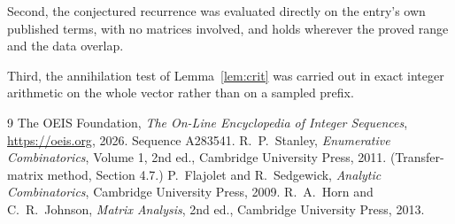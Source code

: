 \documentclass[11pt,a4paper]{article}
\theoremstyle{plain}
\theoremstyle{definition}
\begin{document}
Second, the conjectured recurrence was evaluated directly on the entry's own published terms,
with no matrices involved, and holds wherever the proved range and the data overlap.

Third, the annihilation test of Lemma~\ref{lem:crit} was carried out in exact integer
arithmetic on the whole vector rather than on a sampled prefix.

\begin{thebibliography}{9}
 The OEIS Foundation, \emph{The On-Line Encyclopedia of Integer
Sequences}, \url{https://oeis.org}, 2026. Sequence A283541.
 R.~P.~Stanley, \emph{Enumerative Combinatorics}, Volume 1, 2nd ed.,
Cambridge University Press, 2011. (Transfer-matrix method, Section 4.7.)
 P.~Flajolet and R.~Sedgewick, \emph{Analytic Combinatorics}, Cambridge
University Press, 2009.
 R.~A.~Horn and C.~R.~Johnson, \emph{Matrix Analysis}, 2nd ed., Cambridge
University Press, 2013.
\end{thebibliography}
\end{document}
